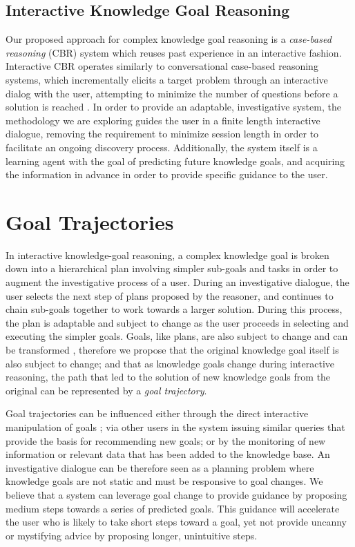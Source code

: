 \documentclass[letterpaper]{article}
\begin{document}
\subsection{Interactive Knowledge Goal Reasoning}

Our proposed approach for complex knowledge goal reasoning is a \textit{case-based reasoning} (CBR) \cite{kolodner_case-based_1993,lopez_de_mantaras_retrieval_2005} system which reuses past experience in an interactive fashion. Interactive CBR operates similarly to conversational case-based reasoning systems, which incrementally elicits a target problem through an interactive dialog with the user, attempting to minimize the number of questions before a solution is reached \cite{aha_advances_2005}. In order to provide an adaptable, investigative system, the methodology we are exploring guides the user in a finite length interactive dialogue, removing the requirement to minimize session length in order to facilitate an ongoing discovery process. Additionally, the system itself is a learning agent with the goal of predicting future knowledge goals, and acquiring the information in advance in order to provide specific guidance to the user.

\section{Goal Trajectories}

In interactive knowledge-goal reasoning, a complex knowledge goal is broken down into a hierarchical plan involving simpler sub-goals and tasks in order to augment the investigative process of a user. During an investigative dialogue, the user selects the next step of plans proposed by the reasoner, and continues to chain sub-goals together to work towards a larger solution. During this process, the plan is adaptable and subject to change as the user proceeds in selecting and executing the simpler goals. Goals, like plans, are also subject to change and can be transformed \cite{cox_goal_1998}, therefore we propose that the original knowledge goal itself is also subject to change; and that as knowledge goals change during interactive reasoning, the path that led to the solution of new knowledge goals from the original can be represented by a \textit{goal trajectory}.

Goal trajectories can be influenced either through the direct interactive manipulation of goals \cite{cox_mixed-initiative_2007}; via other users in the system issuing similar queries that provide the basis for recommending new goals; or by the monitoring of new information or relevant data that has been added to the knowledge base. An investigative dialogue can be therefore seen as a planning problem where knowledge goals are not static and must be responsive to goal changes. We believe that a system can leverage goal change to provide guidance by proposing medium steps towards a series of predicted goals. This guidance will accelerate the user who is likely to take short steps toward a goal, yet not provide uncanny or mystifying advice by proposing longer, unintuitive steps.
\end{document}
